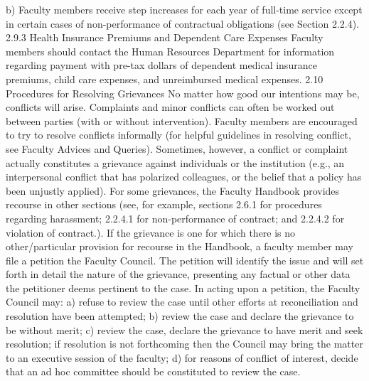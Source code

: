 \documentclass[letterpaper, 11pt]{article}
\begin{document}
b) Faculty members receive step increases for each year of full-time service except in certain cases of non-performance of contractual obligations (see Section 2.2.4).
2.9.3 Health Insurance Premiums and Dependent Care Expenses
   Faculty members should contact the Human Resources Department for information regarding payment with pre-tax dollars of dependent medical insurance premiums, child care expenses, and unreimbursed medical expenses.
2.10 Procedures for Resolving Grievances
   No matter how good our intentions may be, conflicts will arise.  Complaints and minor conflicts can often be worked out between parties (with or without intervention).  Faculty members are encouraged to try to resolve conflicts informally (for helpful guidelines in resolving conflict, see Faculty Advices and Queries).
   Sometimes, however, a conflict or complaint actually constitutes a grievance against individuals or the institution (e.g., an interpersonal conflict that has polarized colleagues, or the belief that a policy has been unjustly applied).  For some grievances, the Faculty Handbook provides recourse in other sections (see, for example, sections 2.6.1 for procedures regarding harassment; 2.2.4.1 for non-performance of contract; and 2.2.4.2 for violation of contract.).
   If the grievance is one for which there is no other/particular provision for recourse in the Handbook, a faculty member may file a petition the Faculty Council.  The petition will identify the issue and will set forth in detail the nature of the grievance, presenting any factual or other data the petitioner deems pertinent to the case.  In acting upon a petition, the Faculty Council may:
a) refuse to review the case until other efforts at reconciliation and resolution have been attempted;
b) review the case and declare the grievance to be without merit;
c) review the case, declare the grievance to have merit and seek resolution; if resolution is not forthcoming then the Council may bring the matter to an executive session of the faculty;
d) for reasons of conflict of interest, decide that an ad hoc committee should be constituted to review the case.
\end{document}
